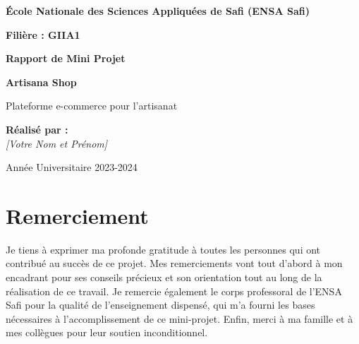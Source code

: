 \documentclass[12pt,a4paper]{report}
\begin{document}
\begin{titlepage}
    \centering
    \vspace*{1cm}
    
    {\Large \textbf{École Nationale des Sciences Appliquées de Safi (ENSA Safi)}\par}
    \vspace{0.5cm}
    {\large \textbf{Filière : GIIA1}\par}
    
    \vspace{4cm}
    {\Huge \bfseries Rapport de Mini Projet\par}
    \vspace{1.5cm}
    {\huge \bfseries Artisana Shop\par}
    \vspace{0.5cm}
    {\Large Plateforme e-commerce pour l'artisanat\par}
    
    \vspace{4cm}
    \begin{flushleft}
        \large
        \textbf{Réalisé par :}\\
        \textit{[Votre Nom et Prénom]}
    \end{flushleft}
    
    \vfill
    {\large Année Universitaire 2023-2024\par}
\end{titlepage}


\chapter*{Remerciement}
Je tiens à exprimer ma profonde gratitude à toutes les personnes qui ont contribué au succès de ce projet. Mes remerciements vont tout d'abord à mon encadrant pour ses conseils précieux et son orientation tout au long de la réalisation de ce travail. Je remercie également le corps professoral de l'ENSA Safi pour la qualité de l'enseignement dispensé, qui m'a fourni les bases nécessaires à l'accomplissement de ce mini-projet. Enfin, merci à ma famille et à mes collègues pour leur soutien inconditionnel.

\end{document}
